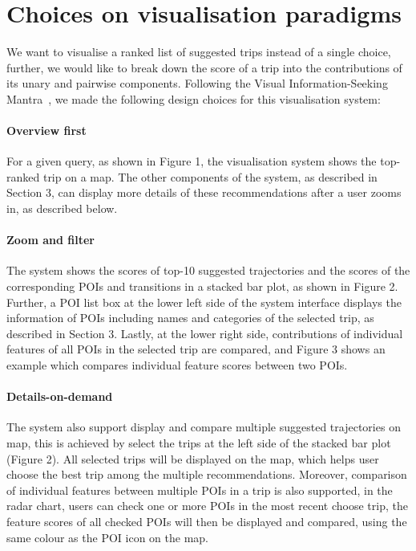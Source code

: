 \documentclass[sigconf]{acmart}
\begin{document}
\section{Choices on visualisation paradigms}


We want to visualise a ranked list of suggested trips instead of a single choice, 
further, we would like to break down the score of a trip into the contributions of its unary and pairwise components.
%
%
Following the Visual Information-Seeking Mantra~\cite{shneiderman1996eyes},
we made the following design choices for this visualisation system:
{
\setlength{\parindent}{0cm}
\paragraph{\bf Overview first}
For a given query, as shown in Figure 1, 
the visualisation system shows the top-ranked trip on a map.
The other components of the system, as described in Section 3, 
can display more details of these recommendations after a user zooms in, as described below.

\paragraph{\bf Zoom and filter}
The system shows the scores of top-10 suggested trajectories and the scores of the corresponding POIs and transitions in a stacked bar plot,
as shown in Figure 2.
Further, a POI list box at the lower left side of the system interface 
displays the information of POIs including names and categories of the selected trip, as described in Section 3. 
Lastly, at the lower right side, contributions of individual features of all POIs in the selected trip are compared, 
and Figure 3 shows an example which compares individual feature scores between two POIs.

\paragraph{\bf Details-on-demand}
The system also support display and compare multiple suggested trajectories on map,
this is achieved by select the trips at the left side of the stacked bar plot (Figure 2).
All selected trips will be displayed on the map, which helps user choose the best trip among the multiple recommendations.
Moreover, comparison of individual features between multiple POIs in a trip is also supported,
in the radar chart, users can check one or more POIs in the most recent choose trip, 
the feature scores of all checked POIs will then be displayed and compared, using the same colour as the POI icon on the map.
}
\end{document}
